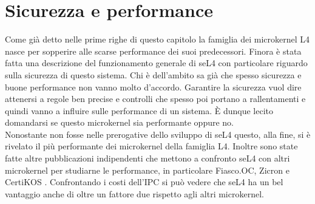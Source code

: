 \section{Sicurezza e performance}
Come già detto nelle prime righe di questo capitolo la famiglia dei microkernel L4 nasce per sopperire alle scarse performance dei suoi predecessori. Finora è stata fatta una descrizione del funzionamento generale di seL4 con particolare riguardo sulla sicurezza di questo sistema. Chi è dell'ambito sa già che spesso sicurezza e buone performance non vanno molto d'accordo. Garantire la sicurezza vuol dire attenersi a regole ben precise e controlli che spesso poi portano a rallentamenti e quindi vanno a influire sulle performance di un sistema. È dunque lecito domandarsi se questo microkernel sia performante oppure no.\\
Nonostante non fosse nelle prerogative dello sviluppo di seL4 questo, alla fine, si è rivelato il più performante dei microkernel della famiglia L4. Inoltre sono state fatte altre pubblicazioni indipendenti che mettono a confronto seL4 con altri microkernel per studiarne le performance, in particolare Fiasco.OC, Zicron \cite{skybridge} e CertiKOS \cite{CertiKOS}. Confrontando i costi dell'IPC si può vedere che seL4 ha un bel vantaggio anche di oltre un fattore due rispetto agli altri microkernel.